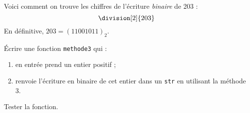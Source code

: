 \documentclass[a4paper,12pt,french]{book}
\begin{document}
\begin{methode}
Voici comment on trouve les chiffres de l'écriture \textit{binaire} de 203 :
$$\division[2]{203}$$
En définitive, $203=(11001011)_2$.
\end{methode}


\begin{exercice}[]
\'Ecrire une fonction \texttt{methode3} qui :
\begin{enumerate}[--]
	\item 	en entrée prend  un entier positif ;
	\item 	renvoie l'écriture en binaire de cet entier dans un \texttt{str} en utilisant la méthode 3.\\
\end{enumerate}
Tester la fonction.
\end{exercice}
\end{document}
